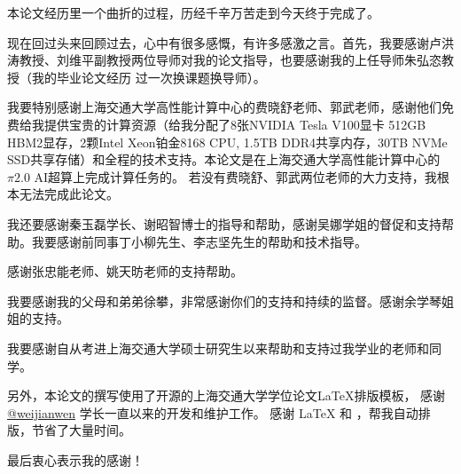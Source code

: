 
\begin{acknowledgements}
  本论文经历里一个曲折的过程，历经千辛万苦走到今天终于完成了。

  现在回过头来回顾过去，心中有很多感慨，有许多感激之言。首先，我要感谢卢洪涛教授、刘维平副教授两位导师对我的论文指导，也要感谢我的上任导师朱弘恣教授（我的毕业论文经历
  过一次换课题换导师）。

  我要特别感谢上海交通大学高性能计算中心的费晓舒老师、郭武老师，感谢他们免费给我提供宝贵的计算资源（给我分配了8张NVIDIA Tesla V100显卡 512GB HBM2显存，2颗Intel Xeon铂金8168 CPU, 
  1.5TB DDR4共享内存，30TB NVMe SSD共享存储）和全程的技术支持。本论文是在上海交通大学高性能计算中心的$\pi 2.0$ AI超算上完成计算任务的。
  若没有费晓舒、郭武两位老师的大力支持，我根本无法完成此论文。

  我还要感谢秦玉磊学长、谢昭智博士的指导和帮助，感谢吴娜学姐的督促和支持帮助。我要感谢前同事丁小柳先生、李志坚先生的帮助和技术指导。

  感谢张忠能老师、姚天昉老师的支持帮助。

  我要感谢我的父母和弟弟徐攀，非常感谢你们的支持和持续的监督。感谢余学琴姐姐的支持。

  我要感谢自从考进上海交通大学硕士研究生以来帮助和支持过我学业的老师和同学。

  另外，本论文的撰写使用了开源的\href{https://github.com/sjtug/SJTUThesis}{\sjtuthesis}上海交通大学学位论文\LaTeX{}排版模板， 
  感谢 \href{https://github.com/weijianwen}{@weijianwen} 学长一直以来的开发和维护工作。
  感谢 \LaTeX{} 和 \href{https://github.com/sjtug/SJTUThesis}{\sjtuthesis}，帮我自动排版，节省了大量时间。

  最后衷心表示我的感谢！

  
\end{acknowledgements}
